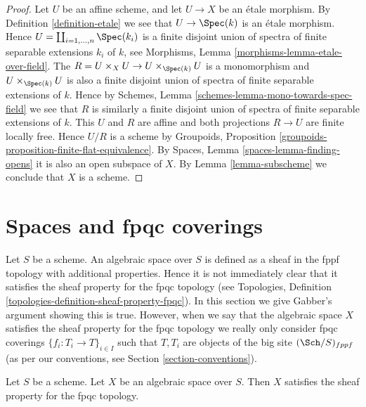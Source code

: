 \begin{proof}
Let $U$ be an affine scheme, and let $U \to X$ be an \'etale morphism. By
Definition \ref{definition-etale}
we see that $U \to \Spec(k)$ is an \'etale
morphism. Hence $U = \coprod_{i = 1, \ldots, n} \Spec(k_i)$
is a finite disjoint union of spectra of finite separable extensions
$k_i$ of $k$, see
Morphisms, Lemma \ref{morphisms-lemma-etale-over-field}.
The $R = U \times_X U \to U \times_{\Spec(k)} U$ is a monomorphism
and $U \times_{\Spec(k)} U$ is also a finite disjoint union of
spectra of finite separable extensions of $k$. Hence by
Schemes, Lemma \ref{schemes-lemma-mono-towards-spec-field}
we see that $R$ is similarly a finite disjoint union of
spectra of finite separable extensions of $k$.
This $U$ and $R$ are affine and
both projections $R \to U$ are finite locally free.
Hence $U/R$ is a scheme by
Groupoids, Proposition \ref{groupoids-proposition-finite-flat-equivalence}.
By
Spaces, Lemma \ref{spaces-lemma-finding-opens}
it is also an open subspace of $X$. By
Lemma \ref{lemma-subscheme}
we conclude that $X$ is a scheme.
\end{proof}













\section{Spaces and fpqc coverings}
\label{section-fpqc}

\noindent
Let $S$ be a scheme.
An algebraic space over $S$ is defined as a sheaf in the fppf topology with
additional properties. Hence it is not immediately clear that it satisfies
the sheaf property for the fpqc topology (see
Topologies, Definition \ref{topologies-definition-sheaf-property-fpqc}).
In this section we give Gabber's argument showing this is true.
However, when we say that the algebraic space $X$ satisfies the
sheaf property for the fpqc topology we really only consider fpqc
coverings $\{f_i : T_i \to T\}_{i \in I}$ such that $T, T_i$ are
objects of the big site $(\Sch/S)_{fppf}$ (as per
our conventions, see Section \ref{section-conventions}).

\begin{proposition}[Gabber]
\label{proposition-sheaf-fpqc}
Let $S$ be a scheme. Let $X$ be an algebraic space over $S$. Then
$X$ satisfies the sheaf property for the fpqc topology.
\end{proposition}


